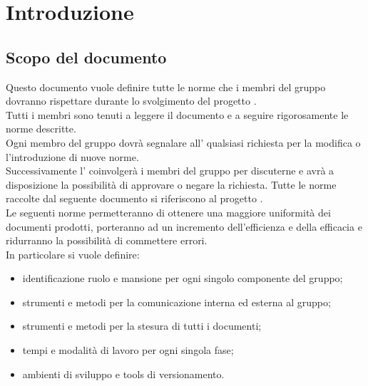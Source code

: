 %


\section{Introduzione}

	\subsection{Scopo del documento}
	Questo documento vuole definire tutte le norme che i membri del gruppo \groupName{} dovranno rispettare durante lo svolgimento del progetto \projectName.\\
	Tutti i membri sono tenuti a leggere il documento e a seguire rigorosamente le norme descritte.\\
	Ogni membro del gruppo dovrà segnalare all'\roleAdministrator{} qualsiasi richiesta per la modifica o l'introduzione di nuove norme.\\
	Successivamente l'\roleAdministrator{} coinvolgerà i membri del gruppo per discuterne e avrà a disposizione la possibilità di approvare o negare la richiesta.
	Tutte le norme raccolte dal seguente documento si riferiscono al progetto \projectName.\\
	Le seguenti norme permetteranno di ottenere una maggiore uniformità dei documenti prodotti, porteranno ad un incremento dell'efficienza e della efficacia e ridurranno la possibilità di commettere errori.\\
	In particolare si vuole definire:
	\begin{itemize}
		\item identificazione ruolo e mansione per ogni singolo componente del gruppo;
		\item strumenti e metodi per la comunicazione interna ed esterna al gruppo;
		\item strumenti e metodi per la stesura di tutti i documenti;
		\item tempi e modalità di lavoro per ogni singola fase;
		\item ambienti di sviluppo e tools di versionamento.
	\end{itemize}

